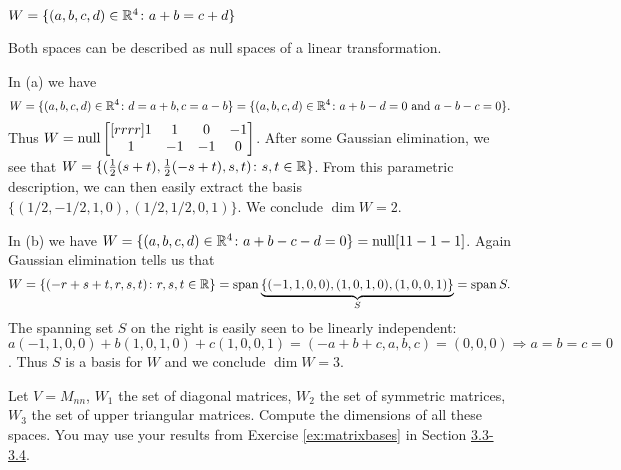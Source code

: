\ii $W=\{(a,b,c,d)\in {\mathbb R}^4\colon a+b=c+d\}$
\ee
\begin{solution}
\noindent
Both spaces can be described as null spaces of a linear transformation. 

In (a) we have 
\[
W=\{(a,b,c,d)\in{\mathbb R}^4\colon d=a+b, c=a-b\}=\{(a,b,c,d)\in{\mathbb R}^4\colon a+b-d=0 \text{ and } a-b-c=0\}.
\]
Thus $W=\operatorname{null} \begin{bmatrix}[rrrr]
1&1&0&-1\\
1&-1&-1&0
\end{bmatrix}$. After some Gaussian elimination, we see that $W=\{(\frac{1}{2}(s+t), \frac{1}{2}(-s+t), s, t)\colon s,t\in{\mathbb R}\}$. From this parametric description, we can then easily extract the basis $\{(1/2,  -1/2, 1, 0), (1/2, 1/2, 0, 1) \}$. We conclude $\dim W=2$. 

In (b) we have $W=\{(a,b,c,d)\in{\mathbb R}^4\colon a+b-c-d=0\}=\operatorname{null} [1 1 -1 -1]$. Again Gaussian elimination tells us that 
\[
W=\{(-r+s+t, r, s, t)\colon r,s,t\in{\mathbb R}\}=\operatorname{span}\underset{S}{\underbrace{\{(-1,1,0,0), (1,0,1,0), (1,0,0,1)\}}}=\operatorname{span} S.
\] 
The spanning set $S$ on the right is easily seen to be linearly independent: $a(-1,1,0,0)+b(1,0,1,0)+c(1,0,0,1)=(-a+b+c,a, b, c)=(0,0,0)\Rightarrow a=b=c=0$. Thus $S$ is a basis for $W$ and we conclude $\dim W=3$. 
\end{solution}
\ii Let $V=M_{nn}$, $W_1$ the set of diagonal matrices, $W_2$ the set of symmetric matrices, $W_3$ the set of upper triangular matrices. Compute the dimensions of all these spaces. You may use your results from Exercise \ref{ex:matrixbases} in Section \hyperref[S:basis]{3.3-3.4}.
\\
